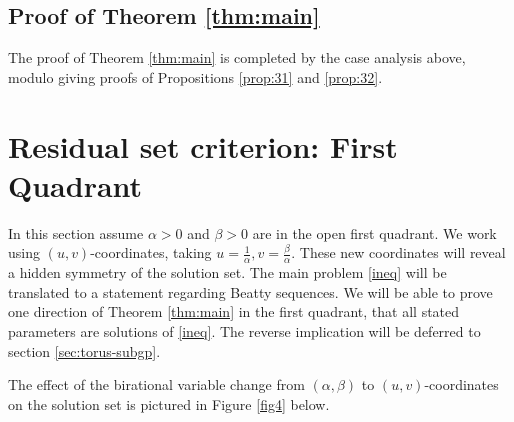 \documentclass[12pt,letterpaper, reqno]{amsart}
\theoremstyle{definition}
\theoremstyle{remark}
\begin{document}
%
%
\subsection{Proof of Theorem \ref{thm:main}} \label{sec:34}


The proof of  Theorem \ref{thm:main} is completed by the  case analysis above,
modulo giving proofs of  Propositions \ref{prop:31} and \ref{prop:32}.




%
%
\section{Residual set criterion: First Quadrant} \label{sec:4}
\setcounter{equation}{0}

In this section assume $\alpha>0$ and $\beta >0$ are in the open first quadrant.
We  work using  $(u, v)$-coordinates, taking  $u= \frac{1}{\alpha}, v= \frac{\beta}{\alpha}$.
These new coordinates will reveal a hidden symmetry of the solution set.
The main problem \eqref{ineq} will be translated to a statement regarding Beatty sequences.
We will be able to prove one direction of Theorem \ref{thm:main} in the first quadrant, that all stated parameters are solutions of \eqref{ineq}. The reverse implication will be deferred to section \ref{sec:torus-subgp}.

The effect of the birational variable change from $(\alpha, \beta)$ to $(u, v)$-coordinates
on the solution set is
pictured in Figure \ref{fig4} below.
\end{document}
